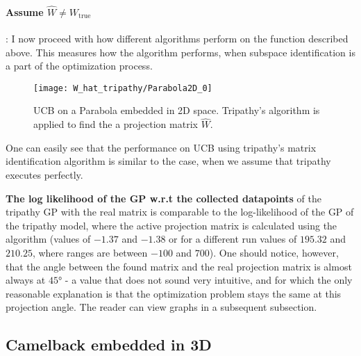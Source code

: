 \paragraph{Assume $\hat{W} \neq W_{\text{true}}$}: I now proceed with how different algorithms perform on the function described above.
This measures how the algorithm performs, when subspace identification is a part of the optimization process.

\begin{figure}[H]
  \centering
      \texttt{[image: W\_hat\_tripathy/Parabola2D\_0]}
  \caption{UCB on a Parabola embedded in 2D space.
  Tripathy's algorithm is applied to find the a projection matrix $\hat{W}$.}
\end{figure}

One can easily see that the performance on UCB using tripathy's matrix identification algorithm is similar to the case, when we assume that tripathy executes perfectly.



\textbf{The log likelihood of the GP w.r.t the collected datapoints} of the tripathy GP with the real matrix is comparable to the log-likelihood of the GP of the tripathy model, where the active projection matrix is calculated using the algorithm (values of $-1.37$ and $-1.38$ or for a different run values of $195.32$ and $210.25$, where ranges are between  $-100$ and $700$).
One should notice, however, that the angle between the found matrix and the real projection matrix is almost always at $45°$ - a value that does not sound very intuitive, and for which the only reasonable explanation is that the optimization problem stays the same at this projection angle.
The reader can view graphs in a subsequent subsection.

\subsection{Camelback embedded in 3D}

